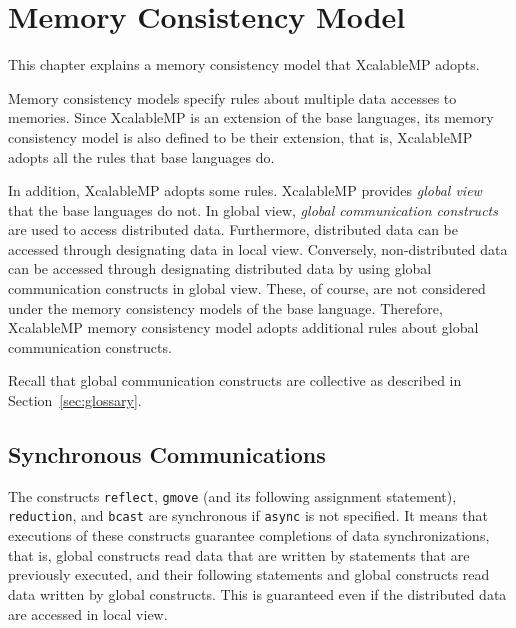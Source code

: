 

\chapter{Memory Consistency Model}



This chapter explains a memory consistency model that XcalableMP adopts.

Memory consistency models specify rules about multiple data accesses
to memories.  Since XcalableMP is an extension of the base languages,
its memory consistency model is also defined to be their extension,
that is, XcalableMP adopts all the rules that base languages do.

In addition, XcalableMP adopts some rules.  XcalableMP provides
\emph{global view} that the base languages do not.  In global view,
\emph{global communication constructs} are used to access distributed
data.  Furthermore, distributed data can be accessed through
designating data in local view.  Conversely, non-distributed data can
be accessed through designating distributed data by using global
communication constructs in global view.  These, of course, are not
considered under the memory consistency models of the base language.
Therefore, XcalableMP memory consistency model adopts additional rules
about global communication constructs.

Recall that global communication constructs are collective as
described in Section~\ref{sec:glossary}.

\section{Synchronous Communications}

The constructs \texttt{reflect}, \texttt{gmove} (and its following
assignment statement), \texttt{reduction}, and \texttt{bcast} are
synchronous if \texttt{async} is not specified.  It means that
executions of these constructs guarantee completions of data
synchronizations, that is, global constructs read data that are
written by statements that are previously executed, and their
following statements and global constructs read data written by global
constructs.  This is guaranteed even if the distributed data are
accessed in local view.

